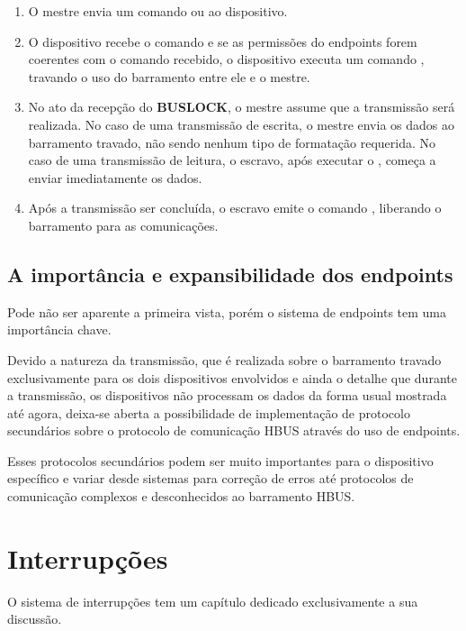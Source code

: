 \begin{enumerate}

\item O mestre envia um comando  ou  ao dispositivo.
\item O dispositivo recebe o comando e se as permissões do endpoints forem coerentes com o comando recebido, o dispositivo executa um comando , travando o uso do barramento entre ele e o mestre.
\item No ato da recepção do \textbf{BUSLOCK}, o mestre assume que a transmissão será realizada. No caso de uma transmissão de escrita, o mestre envia os dados ao barramento travado, não sendo nenhum tipo de formatação requerida.
No caso de uma transmissão de leitura, o escravo, após executar o , começa a enviar imediatamente os dados.
\item Após a transmissão ser concluída, o escravo emite o comando , liberando o barramento para as comunicações.

\end{enumerate}

\subsection{A importância e expansibilidade dos endpoints}

Pode não ser aparente a primeira vista, porém o sistema de endpoints tem uma importância chave.

Devido a natureza da transmissão, que é realizada sobre o barramento travado exclusivamente para os dois dispositivos envolvidos e ainda o detalhe que durante a transmissão, os dispositivos não processam os dados da forma usual mostrada até agora, deixa-se aberta a possibilidade de implementação de protocolo secundários sobre o protocolo de comunicação HBUS através do uso de endpoints.

Esses protocolos secundários podem ser muito importantes para o dispositivo específico e variar desde sistemas para correção de erros até protocolos de comunicação complexos e desconhecidos ao barramento HBUS.

\section{Interrupções}

O sistema de interrupções tem um capítulo dedicado exclusivamente a sua discussão.

